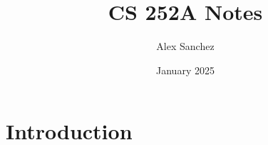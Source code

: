 \documentclass{article}
\title{CS 252A Notes}
\author{Alex Sanchez}
\date{January 2025}
\begin{document}
\maketitle

\section{Introduction}
\end{document}
